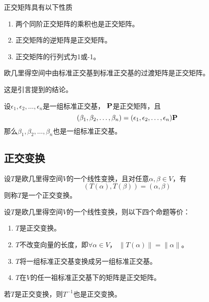 \begin{theorem}[正交矩阵的性质]
  正交矩阵具有以下性质
  \begin{enumerate}
    \item 
    两个同阶正交矩阵的乘积也是正交矩阵。
    \item
    正交矩阵的逆矩阵是正交矩阵。
    \item
    正交矩阵的行列式为1或-1。
  \end{enumerate}
\end{theorem}

\begin{theorem}
  欧几里得空间中由标准正交基到标准正交基的过渡矩阵是正交矩阵。
\end{theorem}

\begin{remark}
  这是引言提到的结论。
\end{remark}

\begin{theorem}
  设$\epsilon_1,\epsilon_2,\dots,\epsilon_n$是一组标准正交基，
  $\mathbf{P}$是正交矩阵，且
  \begin{displaymath}
    (\beta_1,\beta_2,\dots,\beta_n) =
      (\epsilon_1,\epsilon_2,\dots,\epsilon_n)\mathbf{P}
  \end{displaymath}
  那么$\beta_1,\beta_2,\dots,\beta_n$也是一组标准正交基。
\end{theorem}

\subsection{正交变换}
\begin{definition}[正交变换]
  设$T$是欧几里得空间$V$的一个线性变换，且对任意$\alpha,\beta\in V$，有
  \begin{displaymath}
    (T(\alpha), T(\beta)) = (\alpha,\beta)
  \end{displaymath}
  则称$T$是一个正交变换。
\end{definition}

\begin{theorem}[正交变换的等价条件]
  设$T$是欧几里得空间$V$的一个线性变换，则以下四个命题等价：
  \begin{enumerate}
    \item 
    $T$是正交变换。
    \item
    $T$不改变向量的长度，即$\forall\alpha\in V$，
    $\|T(\alpha)\|=\|\alpha\|$。
    \item
    $T$将一组标准正交基变换成另一组标准正交基。
    \item
    $T$在$V$的任一祖标准正交基下的矩阵是正交矩阵。
  \end{enumerate}
\end{theorem}

\begin{theorem}
  若$T$是正交变换，则$T^{-1}$也是正交变换。
\end{theorem}
